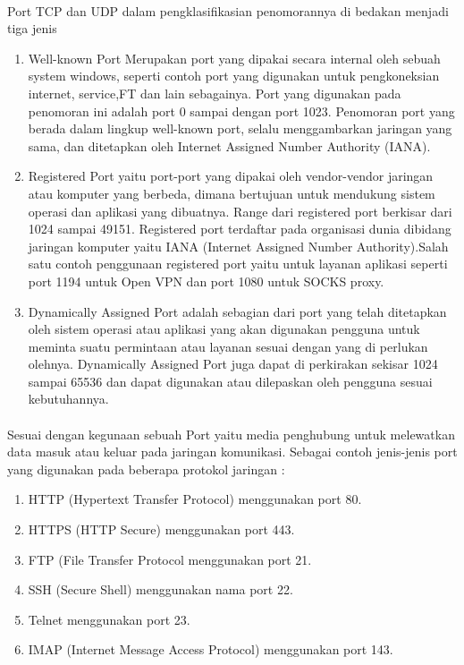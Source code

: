 \documentclass[12pt,a4paper]{article}
\begin{document}
\paragraph{}
\hspace{1cm}
Port TCP dan UDP dalam pengklasifikasian penomorannya di bedakan menjadi tiga jenis
\begin{enumerate}
\item Well-known Port Merupakan port yang dipakai secara internal oleh sebuah system windows, seperti contoh port yang digunakan untuk pengkoneksian internet, service,FT dan lain sebagainya. Port yang digunakan pada penomoran ini adalah port 0 sampai dengan port 1023. Penomoran port yang berada dalam lingkup well-known port, selalu menggambarkan jaringan yang sama, dan ditetapkan oleh Internet Assigned Number Authority (IANA).
\item Registered Port yaitu port-port yang dipakai oleh vendor-vendor jaringan atau komputer yang berbeda, dimana bertujuan  untuk mendukung sistem operasi dan aplikasi yang dibuatnya. Range dari registered port berkisar dari 1024 sampai 49151. Registered port terdaftar pada organisasi dunia dibidang jaringan komputer yaitu IANA (Internet Assigned Number Authority).Salah satu contoh penggunaan registered port yaitu untuk layanan aplikasi seperti port 1194 untuk Open VPN  dan port 1080 untuk SOCKS proxy.
\item Dynamically Assigned Port adalah sebagian dari port yang telah ditetapkan oleh sistem operasi atau aplikasi yang akan digunakan pengguna untuk meminta suatu permintaan atau layanan sesuai dengan yang di perlukan olehnya. Dynamically Assigned Port juga dapat di perkirakan sekisar 1024 sampai 65536 dan dapat digunakan atau dilepaskan oleh pengguna sesuai kebutuhannya.
\end{enumerate} 

\paragraph{}
\hspace{1cm}
Sesuai dengan kegunaan sebuah Port yaitu media penghubung untuk melewatkan data masuk atau keluar pada jaringan komunikasi. Sebagai contoh jenis-jenis port yang digunakan pada beberapa protokol jaringan :\\
\begin{enumerate}
\item HTTP (Hypertext Transfer Protocol) menggunakan port 80.
\item HTTPS (HTTP Secure) menggunakan port 443.
\item FTP (File Transfer Protocol menggunakan port 21.
\item SSH (Secure Shell) menggunakan nama port 22.
\item Telnet menggunakan port 23.
\item IMAP (Internet Message Access Protocol) menggunakan port 143.
\end{enumerate}
\end{document}
